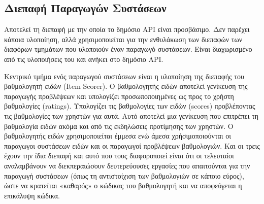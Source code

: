 \subsection{Διεπαφή Παραγωγών Συστάσεων}
Αποτελεί τη διεπαφή με την οποία το δημόσιο ΑΡΙ είναι προσβάσιμο. Δεν παρέχει κάποια υλοποίηση, αλλά χρησιμοποιείται για την ενθυλάκωση των διεπαφών των διαφόρων τμημάτων που υλοποιούν έναν παραγωγό συστάσεων. Είναι διαχωρισμένο από τις υλοποιήσεις του και ανήκει στο δημόσιο ΑΡΙ. \par 
Κεντρικό τμήμα ενός παραγωγού συστάσεων είναι η υλοποίηση της διεπαφής του βαθμολογητή ειδών ({\en Item Scorer}). Ο βαθμολογητής ειδών αποτελεί  γενίκευση της παραγωγής προβλέψεων και υπολογίζει προσωποποιημένες ως προς το χρήστη βαθμολογίες ({\en ratings}). Υπολογίζει τις βαθμολογίες των ειδών ({\en scores}) προβλέποντας τις βαθμολογίες των χρηστών για αυτά. Αυτό αποτελεί μια γενίκευση που επιτρέπει τη βαθμολογία ειδών ακόμα και από τις εκδηλώσεις προτίμησης των χρηστών. Ο βαθμολογητής ειδών χρησιμοποιείται έμμεσα ενώ άμεσα χρήσιμοποιούνται οι παραγωγοι συστάσεων ειδών και οι παραγωγοί προβλέψεων βαθμολογιών. Και οι τρεις έχουν την ίδια διεπαφή και αυτό που τους διαφοροποιεί είναι ότι οι τελευταίοι αναλαμβάνουν να διεκπεραιώσουν δευτερεύουσες εργασίες που απαιτούνται για την παραγωγή συστάσεων (όπως τη αντιστοίχιση των βαθμολογιών σε κάποιο εύρος), ώστε να κρατείται «καθαρός» ο κώδικας του βαθμολογητή και να αποφεύγεται η επικάλυψη κώδικα. 
